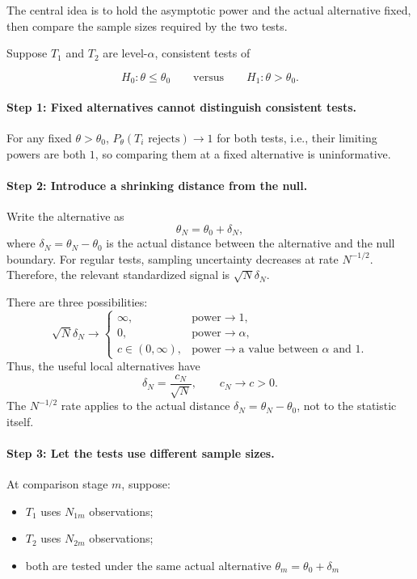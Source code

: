 The central idea is to hold the asymptotic power and the actual alternative fixed, then compare the sample sizes required by the two tests.

Suppose $T_1$ and $T_2$ are level-$\alpha$, consistent tests of

\[
H_0:\theta\leq\theta_0
\qquad\text{versus}\qquad
H_1:\theta>\theta_0.
\]

\paragraph{Step 1: Fixed alternatives cannot distinguish consistent tests.}

For any fixed $\theta>\theta_0$, $P_\theta(T_i\text{ rejects}) \to 1$ for both tests, i.e., their limiting powers are both $1$, so comparing them at a fixed alternative is uninformative.

\paragraph{Step 2: Introduce a shrinking distance from the null.}

Write the alternative as
\[
\theta_N=\theta_0+\delta_N,
\]
where $\delta_N=\theta_N-\theta_0$ is the actual distance between the alternative and the null boundary. For regular tests, sampling uncertainty decreases at rate $N^{-1/2}$. Therefore, the relevant standardized signal is $\sqrt{N} \delta_N$.

There are three possibilities:
\[
\sqrt N \delta_N\to
\begin{cases}
\infty, & \text{power}\to1,\\
0, & \text{power}\to\alpha,\\
c\in(0,\infty), & \text{power}\to\text{a value between }\alpha\text{ and } 1.
\end{cases}
\]
Thus, the useful local alternatives have
\[
\delta_N=\frac{c_N}{\sqrt N},
\qquad c_N\to c>0.
\]
The $N^{-1/2}$ rate applies to the actual distance $\delta_N=\theta_N-\theta_0$, not to the statistic itself.

\paragraph{Step 3: Let the tests use different sample sizes.}
At comparison stage $m$, suppose:
\begin{itemize}
    \item $T_1$ uses $N_{1m}$ observations;
    \item $T_2$ uses $N_{2m}$ observations;
    \item both are tested under the same actual alternative $\theta_m=\theta_0+\delta_m$
\end{itemize}

